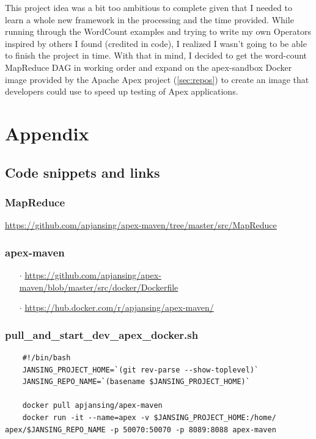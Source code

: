 \documentclass[final]{IEEEtran}
\begin{document}
This project idea was a bit too ambitious to complete given that I needed to learn a whole new framework in the processing and the time provided. While running through the WordCount examples and trying to write my own Operators inspired by others I found (credited in code), I realized I wasn't going to be able to finish the project in time. With that in mind, I decided to get the word-count MapReduce DAG in working order and expand on the apex-sandbox Docker image provided by the Apache Apex project (\ref{sec:repos}) to create an image that developers could use to speed up testing of Apex applications.

\newpage
\section{Appendix}

\subsection{Code snippets and links}
  \subsubsection{MapReduce}\label{sec:map-reduce}
  \url{https://github.com/apjansing/apex-maven/tree/master/src/MapReduce}

  \subsubsection{apex-maven}\label{sec:apex-maven}
  \begin{enumerate}
    \item[$\cdot$] \url{https://github.com/apjansing/apex-maven/blob/master/src/docker/Dockerfile}
    \item[$\cdot$] \url{https://hub.docker.com/r/apjansing/apex-maven/}
  \end{enumerate}
  
  \subsubsection{pull\_and\_start\_dev\_apex\_docker.sh}\label{sec:start-script}
  \begin{lstlisting}
    #!/bin/bash
    JANSING_PROJECT_HOME=`(git rev-parse --show-toplevel)`
    JANSING_REPO_NAME=`(basename $JANSING_PROJECT_HOME)`
    
    docker pull apjansing/apex-maven
    docker run -it --name=apex -v $JANSING_PROJECT_HOME:/home/ apex/$JANSING_REPO_NAME -p 50070:50070 -p 8089:8088 apex-maven
  \end{lstlisting}
  
\end{document}
